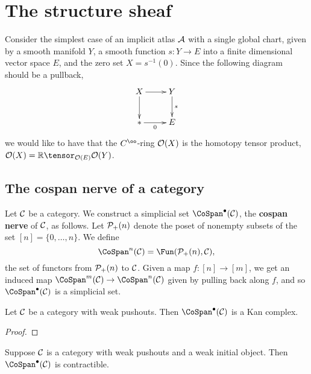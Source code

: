 
\section{The structure sheaf}

Consider the simplest case of an implicit atlas $\mathcal A$ with a single global chart, given by a smooth manifold $Y$, a smooth function $s: Y \to E$ into a finite dimensional vector space $E$, and the zero set $X = s^{-1}(0)$. Since the following diagram should be a pullback,
\[ \xymatrix{X \ar[r] \ar[d] & Y \ar[d]^-{s} \\ {*} \ar[r]_-{0} & E}\]
we would like to have that the $C^\oo$-ring $\mathcal O(X)$ is the homotopy tensor product, $\cO(X) = \RR \tensor_{\cO(E)} \cO(Y)$.


\subsection{The cospan nerve of a category}

\begin{definition}\label{cospan-nerve}
Let $\mathcal C$ be a category. We construct a simplicial set $\CoSpan^\bullet(\cC)$, the {\bf cospan nerve} of $\mathcal C$, as follows. Let $\mathcal P_+(n)$ denote the poset of nonempty subsets of the set $[n] = \{0, \dots, n\}$. We define
\[ \CoSpan^n(\cC) = \Fun(\cP_+(n), \cC), \]
the set of functors from $\mathcal P_+(n)$ to $\mathcal C$. Given a map $f: [n] \to [m]$, we get an induced map $\CoSpan^m(\cC) \to \CoSpan^n(\cC)$ given by pulling back along $f$, and so $\CoSpan^\bullet(\cC)$ is a simplicial set.
\end{definition}

\begin{prop}\label{cospans-are-kan}
Let $\mathcal C$ be a category with weak pushouts. Then $\CoSpan^\bullet(\cC)$ is a Kan complex.
\end{prop}

\begin{proof}
\jake{[To be completed.]}
\end{proof}

\begin{speculation}
Suppose $\mathcal C$ is a category with weak pushouts and a weak initial object. Then $\CoSpan^\bullet(\cC)$ is contractible.
\end{speculation}

